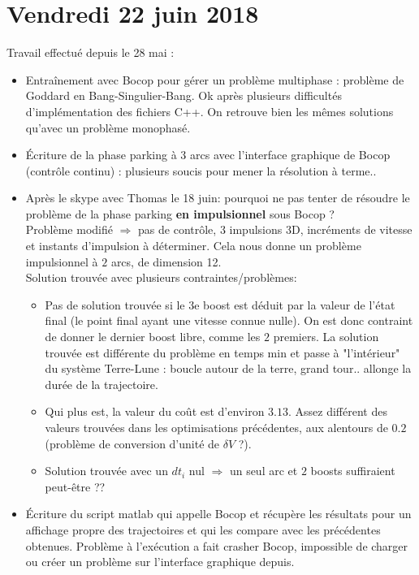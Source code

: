 \documentclass[fleqn,%
a4paper,11pt]{scrbook}
\begin{document}
\section*{Vendredi 22 juin 2018}
Travail effectué depuis le 28 mai : \\
\begin{itemize}
	\item Entraînement avec Bocop pour gérer un problème multiphase : problème de Goddard en Bang-Singulier-Bang. Ok après plusieurs difficultés d'implémentation des fichiers C++. On retrouve bien les mêmes solutions qu'avec un problème monophasé. \\
	
	\item Écriture de la phase parking à 3 arcs avec l'interface graphique de Bocop (contrôle continu) : plusieurs soucis pour mener la résolution à terme.. \\
	
	\item Après le skype avec Thomas le 18 juin: pourquoi ne pas tenter de résoudre le problème de la phase parking \textbf{en impulsionnel} sous Bocop ?\\
	Problème modifié $\Rightarrow$ pas de contrôle, $3$ impulsions $3$D, incréments de vitesse et instants d'impulsion à déterminer. Cela nous donne un problème impulsionnel à $2$ arcs, de dimension 12. \\
	Solution trouvée avec plusieurs contraintes/problèmes: 
	\begin{itemize}
		\item Pas de solution trouvée si le $3$e boost est déduit par la valeur de l'état final (le point final ayant une vitesse connue nulle). On est donc contraint de donner le dernier boost libre, comme les $2$ premiers. La solution trouvée est différente du problème en temps min et passe à "l'intérieur" du système Terre-Lune : boucle autour de la terre, grand tour.. allonge la durée de la trajectoire.
		\item Qui plus est, la valeur du coût est d'environ $3.13$. Assez différent des valeurs trouvées dans les optimisations précédentes, aux alentours de $0.2$ (problème de conversion d'unité de $\delta V$ ?).
		\item Solution trouvée avec un $dt_i$ nul $\Rightarrow$ un seul arc et $2$ boosts suffiraient peut-être ??
	\end{itemize} 
	
	\item Écriture du script matlab qui appelle Bocop et récupère les résultats pour un affichage propre des trajectoires et qui les compare avec les précédentes obtenues. Problème à l'exécution a fait crasher Bocop, impossible de charger ou créer un problème sur l'interface graphique depuis.
\end{itemize}
\end{document}
